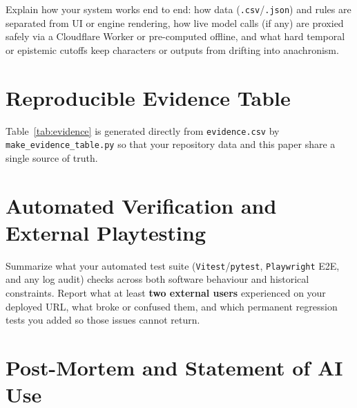 \documentclass[12pt,a4paper]{article}
\renewcommand{\footnotesize}{\fontsize{10}{12}\selectfont}
\begin{document}
Explain how your system works end to end: how data (\texttt{.csv}/\texttt{.json})
and rules are separated from UI or engine rendering, how live model calls (if any)
are proxied safely via a Cloudflare Worker or pre-computed offline, and what hard
temporal or epistemic cutoffs keep characters or outputs from drifting into
anachronism.


\section{Reproducible Evidence Table}

Table~\ref{tab:evidence} is generated directly from \texttt{evidence.csv} by
\texttt{make\_evidence\_table.py} so that your repository data and this paper share
a single source of truth.

\begin{table}[htbp]
  \centering
  \footnotesize
  \singlespacing
  \renewcommand{\arraystretch}{1.25}
  
  \caption{Core claims and design elements with locators, evidence tiers
  (\emph{据} documented, \emph{推断} inferred, \emph{设} invented), and boundaries.}
  \label{tab:evidence}
\end{table}

\section{Automated Verification and External Playtesting}

Summarize what your automated test suite (\texttt{Vitest}/\texttt{pytest},
\texttt{Playwright} E2E, and any log audit) checks across both software behaviour
and historical constraints. Report what at least \textbf{two external users}
experienced on your deployed URL, what broke or confused them, and which permanent
regression tests you added so those issues cannot return.

\section{Post-Mortem and Statement of AI Use}
\end{document}
